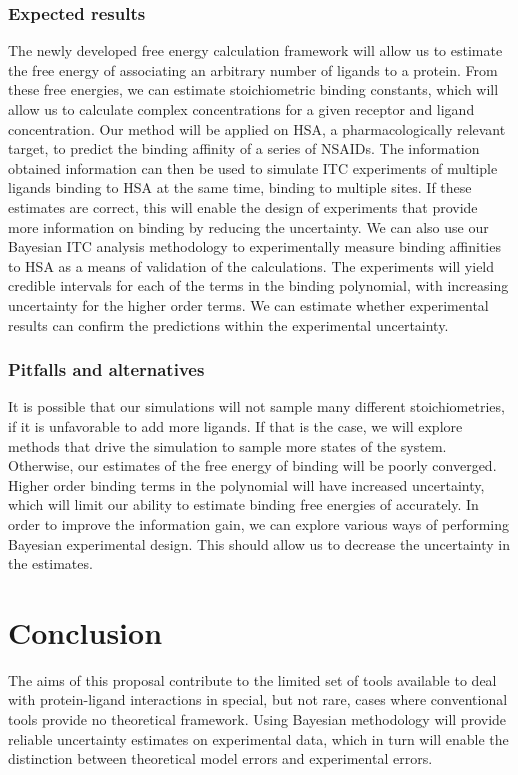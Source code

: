 \documentclass[10pt,final]{article}
\begin{document}
\subsubsection*{Expected results}
The newly developed free energy calculation framework will allow us to estimate the free energy of associating an arbitrary number of ligands to a protein.
%
From these free energies, we can estimate stoichiometric binding constants, which will allow us to calculate complex concentrations for a given receptor and ligand concentration.
%
Our method will be applied on HSA, a pharmacologically relevant target, to predict the binding affinity of a series of NSAIDs. 
%
The information obtained information can then be used to simulate ITC experiments of multiple ligands binding to HSA at the same time, binding to multiple sites.
%
If these estimates are correct, this will enable the design of experiments that provide more information on binding by reducing the uncertainty.
%
We can also use our Bayesian ITC analysis methodology to experimentally measure binding affinities to HSA as a means of validation of the calculations.
%
The experiments will yield credible intervals for each of the terms in the binding polynomial, with increasing uncertainty for the higher order terms.
%
We can estimate whether experimental results can confirm the predictions within the experimental uncertainty.

\subsubsection*{Pitfalls and alternatives}
It is possible that our simulations will not sample many different stoichiometries, if it is unfavorable to add more ligands.
%
If that is the case, we will explore methods that drive the simulation to sample more states of the system.
%
Otherwise, our estimates of the free energy of binding will be poorly converged.
%
Higher order binding terms in the polynomial will have increased uncertainty, which will limit our ability to estimate binding free energies of accurately.
%
In order to improve the information gain, we can explore various ways of performing Bayesian experimental design.
%
This should allow us to decrease the uncertainty in the estimates.

\section*{Conclusion}
The aims of this proposal contribute to the limited set of tools available to deal with protein-ligand interactions in special, but not rare, cases where conventional tools provide no theoretical framework. Using Bayesian methodology will provide reliable uncertainty estimates on experimental data, which in turn will enable the distinction between theoretical model errors and experimental errors.

\setlength{\emergencystretch}{1em}
\printbibliography
\end{document}
